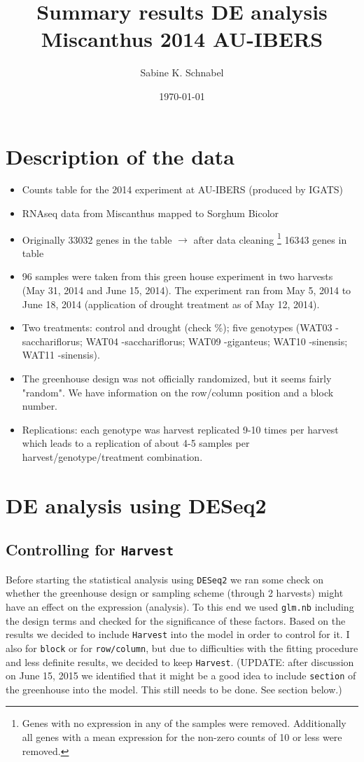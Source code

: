 \documentclass[12pt, a4paper]{article}
\title{Summary results DE analysis Miscanthus 2014 AU-IBERS}
\author{Sabine K. Schnabel}
\date{\today}
\begin{document}
\maketitle

\section*{Description of the data}
\begin{itemize}
\item Counts table for the 2014 experiment at AU-IBERS (produced by IGATS)
\item RNAseq data from Miscanthus mapped to Sorghum Bicolor
\item Originally 33032 genes in the table $\rightarrow$ after data cleaning
\footnote{Genes with no expression in any of the samples were removed. Additionally all genes with a mean expression for the non-zero counts of 10 or less were removed.} 
16343 genes in table 
\item 96 samples were taken from this green house experiment in two harvests (May 31, 2014 and June 15, 2014). The 
experiment ran from May 5, 2014 to June 18, 2014 (application of drought treatment as of May 12, 2014).
\item Two treatments: control and drought (check \%); five genotypes (WAT03 -sacchariflorus; 
WAT04 -sacchariflorus; 
WAT09 -giganteus; 
WAT10 -sinensis; 
WAT11 -sinensis).
\item The greenhouse design was not officially randomized, but it seems fairly "random". We have information on
the row/column position and a block number.
\item Replications: each genotype was harvest replicated 9-10 times per harvest which leads to a replication of about 4-5 samples per harvest/genotype/treatment combination. 
\end{itemize}

\section*{DE analysis using DESeq2}
\subsection*{Controlling for \texttt{Harvest}}
Before starting the statistical analysis using \texttt{DESeq2} we ran some check on whether the greenhouse design or 
sampling scheme (through 2 harvests) might have an effect on the expression (analysis). 
To this end we used \texttt{glm.nb} including the design terms and checked for the significance of these factors. 
Based on the results we decided to include \texttt{Harvest} into the model in order to control for it. I also 
for \texttt{block} or for \texttt{row/column}, but due to difficulties with the fitting procedure and less definite 
results, we decided to keep \texttt{Harvest}. 
\newline (UPDATE: after discussion on June 15, 2015 we identified that it 
might be a good idea to include \texttt{section} of the greenhouse into the model. This still needs to be 
done. See section below.)
\end{document}
